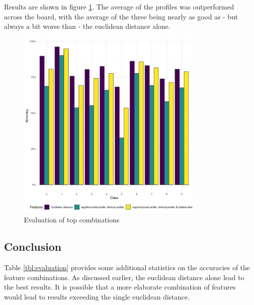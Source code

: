\documentclass[a4paper]{scrreprt}
\begin{document}
Results are shown in figure \ref{fig:evaluation_top}. The average of the
profiles was outperformed across the board, with the average of the three being
nearly as good as - but always a bit worse than - the euclidean distance alone.

\begin{figure}[h]
        \centering
		\includegraphics[width=0.8\textwidth]{../resources/features_top.png}
		\caption{Evaluation of top combinations}
		\label{fig:evaluation_top}
\end{figure}

\subsection{Conclusion}

Table \ref{tbl:evaluation} provides some additional statistics on the
accuracies of the feature combinations. As discussed earlier, the euclidean
distance alone lead to the best results. It is possible that a more elaborate
combination of features would lead to results exceeding the single euclidean
distance.
\end{document}
